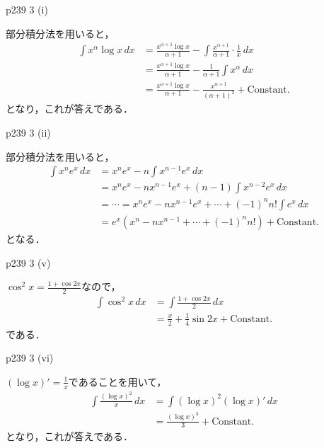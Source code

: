\documentclass[dvipdfmx,uplatex,11pt]{jsarticle}
\theoremstyle{definition}
\begin{document}
\newpage

p239 3 (i)

\begin{leftbar}
    部分積分法を用いると，
    \begin{align*}
        \int x^\alpha \log x \, dx & = \frac{x^{\alpha +1} \log x}{\alpha +1}　- \int \frac{x^{\alpha +1}}{\alpha+1} \cdot \frac{1}{x} \, dx \\
        & = \frac{x^{\alpha +1} \log x}{\alpha +1}- \frac{1}{\alpha +1} \int x^{\alpha} \, dx \\
        & = \frac{x^{\alpha+1} \log x}{\alpha +1} - \frac{x^{\alpha +1}}{(\alpha +1)^2}+ \mathrm{Constant.}
    \end{align*}
    となり，これが答えである．
\end{leftbar}

p239 3 (ii)

\begin{leftbar}
    部分積分法を用いると，
    \begin{align*}
        \int x^n e^x \, dx & = x^n e^x - n \int x^{n-1} e^x \, dx \\
        & = x^n e^x - n x^{n-1} e^x + (n-1)\int x^{n-2} e^x \, dx \\
        & = \cdots = x^n e^x - n x^{n-1} e^x + \cdots + (-1)^n n! \int e^x \, dx \\
        & = e^x (x^n -n x^{n-1}+ \cdots +(-1)^n n!) + \mathrm{Constant.}
    \end{align*}
    となる．
\end{leftbar}

\newpage 

p239 3 (v)

\begin{leftbar}
    $\cos ^2 x = \frac{1+\cos 2x}{2}$なので，
    \begin{align*}
        \int \cos ^2 x \, dx & = \int \frac{1+\cos 2x}{2} \, dx \\
        & = \frac{x}{2}+\frac{1}{4} \sin 2x + \mathrm{Constant.}
    \end{align*}
    である．
\end{leftbar}

p239 3 (vi)

\begin{leftbar}
    $(\log x)' = \frac{1}{x}$であることを用いて，
    \begin{align*}
        \int \frac{(\log x)^2}{x} \, dx & = \int (\log x)^2 (\log x)' \, dx \\
        & = \frac{(\log x)^3}{3} + \mathrm{Constant.}
    \end{align*}
    となり，これが答えである．
\end{leftbar}
\end{document}
